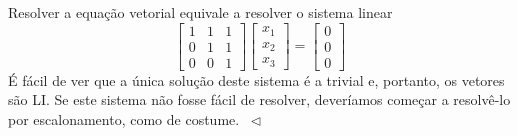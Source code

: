 \begin{ex}
Resolver a equação vetorial equivale a resolver o sistema linear
\begin{equation}
\left[
  \begin{array}{ccc}
    1 & 1 & 1 \\
    0 & 1 & 1 \\
    0 & 0 & 1 
  \end{array}
\right]
\left[
  \begin{array}{c}
    x_1 \\
    x_2 \\
    x_3 
  \end{array}
\right] =
\left[
  \begin{array}{c}
    0 \\
    0 \\
    0 
  \end{array}
\right]
\end{equation} É fácil de ver que a única solução deste sistema é a trivial e, portanto, os vetores são LI. Se este sistema não fosse fácil de resolver, deveríamos começar a resolvê-lo por escalonamento, como de costume. $\ \lhd$
\end{ex}

